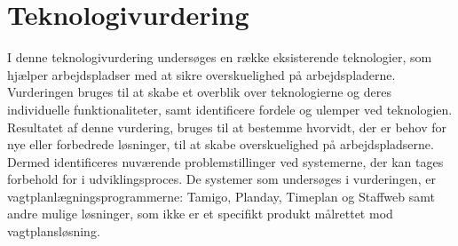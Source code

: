 


\section{Teknologivurdering}
I denne teknologivurdering undersøges en række eksisterende teknologier, som  hjælper arbejdspladser med at sikre overskuelighed på arbejdspladerne. Vurderingen bruges til at skabe et overblik over teknologierne og deres individuelle funktionaliteter, samt identificere fordele og ulemper ved teknologien. Resultatet af denne vurdering, bruges til at bestemme hvorvidt, der er behov for nye eller forbedrede løsninger, til at skabe overskuelighed på arbejdspladserne. Dermed identificeres nuværende problemstillinger ved systemerne, der kan tages forbehold for i udviklingsproces. De systemer som undersøges i vurderingen, er vagtplanlægningsprogrammerne: Tamigo, Planday, Timeplan og Staffweb samt andre mulige løsninger, som ikke er et specifikt produkt målrettet mod vagtplansløsning.

